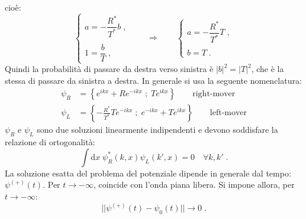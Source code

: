 \documentclass[10pt,a4paper]{report}
\theoremstyle{definition}
\numberwithin{equation}{section}
\newcommand{\diff}[1][]{\mathrm{d}#1}
\begin{document}
cioè:
\begin{equation}
\begin{cases}
a=-\dfrac{R^*}{T^*}b\;, \\
\\
1=\dfrac{b}{T}\;,
\end{cases}\qquad \Longrightarrow\qquad
\begin{cases}
a=-\dfrac{R^*}{T^*}T\;, \\
\\
b=T\;.
\end{cases}
\end{equation}
Quindi la probabilità di passare da destra verso sinistra è $|b|^2=|T|^2$, che è la stessa di passare da sinistra a destra. In generale si usa la seguente nomenclatura:
\begin{align}
\psi_R &=\left\{e^{ikx}+Re^{-ikx}\; ;\; Te^{ikx}\right\} \qquad \mbox{right-mover} \\
\psi_L &=\left\{-\frac{R^*}{T^*}Te^{-ikx}\; ;\; e^{-ikx}+Te^{ikx}\right\}\qquad \mbox{left-mover}
\end{align}
$\psi_R$ e $\psi_L$ sono due soluzioni linearmente indipendenti e devono soddisfare la relazione di ortogonalità:
\begin{equation}
\int\diff{x}\;\psi_R^*(k,x)\psi_L(k',x)=0 \quad \forall k,k'\;.
\end{equation}
La soluzione esatta del problema del potenziale dipende in generale dal tempo: $\psi^{(+)}(t)$. Per $t\to-\infty$, coincide con l'onda piana libera. Si impone allora, per $t\to-\infty$:
\begin{equation}
||\psi^{(+)}(t)-\psi_0(t)||\to 0\;.
\end{equation}
\end{document}
